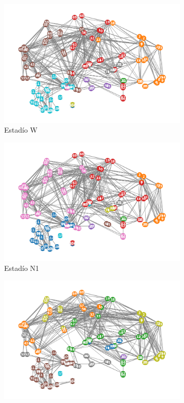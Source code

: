 \documentclass{article}
\begin{document}
\begin{figure}[!htb]
	\centering
	\begin{subfigure}[b]{0.45\textwidth}
		\includegraphics[width= \textwidth]{fg/modulos_W.png}
        \caption{Estadío W}
		\label{modulos_W}
	\end{subfigure}
	\begin{subfigure}[b]{0.45\textwidth}
		\includegraphics[width= \textwidth]{fg/modulos_N1.png}
        \caption{Estadío N1}
        \label{modulos_N1}
	\end{subfigure}
 	\begin{subfigure}[b]{0.45\textwidth}
		\includegraphics[width= \textwidth]{fg/modulos_N2.png}

\end{subfigure}
\end{figure}
\end{document}
